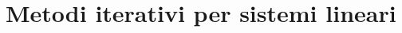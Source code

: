 \documentclass[a4paper]{report}
\theoremstyle{definition}
\theoremstyle{remark}
\begin{document}








\section{Metodi iterativi per sistemi lineari}
\end{document}
